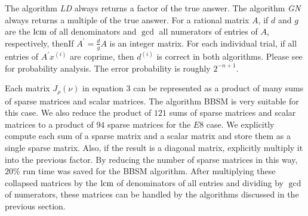 The algorithm {\em LD}
always returns a factor of the true answer.
The algorithm {\em GN}
always returns a multiple of the true answer.
For a rational matrix $A$, if 
$d$ and $g$ are the $\mbox{lcm}$ of all denominators 
and $\gcd$ all numerators of entries of $A$, respectively,
thenIf $A^\prime = \frac{d}{g}A$ is an integer matrix.
For each individual trial,
if all entries of  $A^\prime x^{(i)}$ are coprime,
then $d^{(i)}$ is correct in both algorithms.
Please see \cite{Saunders::LA::2004} for probability analysis. 
The error probability is roughly $2^{-n + 1}$.

Each matrix $J_\rho(\nu)$ in equation 3 can be represented as
a product of many sums of sparse matrices and scalar matrices.
The algorithm BBSM is very suitable for this case.
We also reduce the product of $121$ sums of sparse matrices and scalar matrices
to a product of $94$ sparse matrices for the $E8$ case. 
We explicitly compute each sum of a sparse matrix and a scalar matrix and 
store them as a single sparse matrix.  Also, if the result is a diagonal matrix,
explicitly multiply it into the previous factor.
By reducing the number of sparse matrices in this way, 
$20\%$ run time was saved for the BBSM algorithm. 
After multiplying these collapsed matrices 
by the $\mbox{lcm}$ of denominators of all entries and dividing
by $\gcd$ of numerators, these matrices can be handled by the
algorithms discussed in the previous section.


